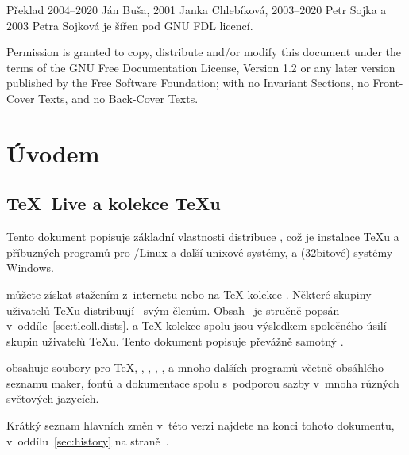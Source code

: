 \documentclass[\classoptions,slovak,english,czech]{\classname}
\newcommand\TKCS{\textsf{\TeX-kolekce}}
\begin{document}
\ifnum{}
  \thispagestyle{csbul}
  \ifforbulletin \setcounter{page}{113} %
  \else \raggedbottom
  \fi
\fi

Překlad 
  2004--2020 Ján Buša, 
  2001 Janka Chlebíková,
  2003--2020 Petr Sojka a 
  2003 Petra Sojková 
je šířen pod GNU FDL licencí.
  
Permission is granted to copy, distribute and/or modify this document
under the terms of the GNU Free Documentation License, Version 1.2
or any later version published by the Free Software Foundation;
with no Invariant Sections, no Front-Cover Texts, and no
Back-Cover Texts.

\bigskip  %


\tableofcontents

\section{Úvodem}
\label{sec:intro}

\subsection{\TeX\ Live a kolekce \TeX{}u}

Tento dokument popisuje základní vlastnosti distribuce \TeXLive{} \thisyear,
což je instalace \TeX{}u a příbuzných programů pro /Linux a další
unixové systémy, \MacOSX{} a (32bitové) systémy Windows.

\TL{} můžete získat stažením z~internetu nebo na \TKCS{} \DVD.
Některé skupiny uživatelů \TeX{}u distribuují \DVD\ svým členům. 
Obsah \DVD\ je stručně popsán v~oddíle~\ref{sec:tlcoll.dists}.
\TL{} a \TKCS{} spolu jsou výsledkem společného úsilí 
skupin uživatelů \TeX u. Tento dokument popisuje převážně samotný \TL{}.

\TL{} obsahuje  soubory pro \TeX, \LaTeXe, \ConTeXt, 
\MF, \MP, \BibTeX{} a mnoho dalších programů včetně obsáhlého
seznamu maker, fontů a dokumentace spolu s~podporou
sazby v~mnoha různých světových jazycích. 


Krátký seznam hlavních změn v~této verzi \TL{}
najdete na konci tohoto dokumentu, v~oddílu~\ref{sec:history} 
na straně~\pageref{sec:history}.

\end{document}
